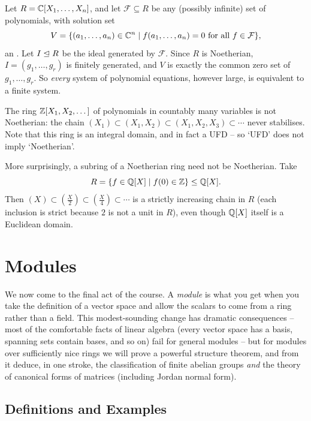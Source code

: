 \documentclass[a4paper]{scrartcl}
\begin{document}
\begin{example}
	Let $R = \mathbb{C}[X_1, \dots, X_n]$, and let $\mathcal{F} \subseteq R$ be any (possibly infinite) set of polynomials, with solution set
	$$
	V = \{(a_1, \dots, a_n) \in \mathbb{C}^n \mid f(a_1, \dots, a_n) = 0 \text{ for all } f \in \mathcal{F}\},
	$$
	an . Let $I \trianglelefteq R$ be the ideal generated by $\mathcal F$. Since $R$ is Noetherian, $I = (g_1, \dots, g_r)$ is finitely generated, and $V$ is exactly the common zero set of $g_1, \dots, g_r$. So \emph{every} system of polynomial equations, however large, is equivalent to a finite system.
\end{example}

\begin{example}
	The ring $\mathbb{Z}[X_1, X_2, \dots]$ of polynomials in countably many variables is not Noetherian: the chain $(X_1) \subset (X_1, X_2) \subset (X_1, X_2, X_3) \subset \cdots$ never stabilises. Note that this ring is an integral domain, and in fact a UFD -- so `UFD' does not imply `Noetherian'.

	More surprisingly, a subring of a Noetherian ring need not be Noetherian. Take
	$$
	R = \{f \in \mathbb{Q}[X] \mid f(0) \in \mathbb{Z}\} \leq \mathbb{Q}[X].
	$$
	Then $(X) \subset \left(\frac{X}{2}\right) \subset \left(\frac{X}{4}\right) \subset \cdots$ is a strictly increasing chain in $R$ (each inclusion is strict because $2$ is not a unit in $R$), even though $\mathbb{Q}[X]$ itself is a Euclidean domain.
\end{example}

\section{Modules}

We now come to the final act of the course. A \emph{module} is what you get when you take the definition of a vector space and allow the scalars to come from a ring rather than a field. This modest-sounding change has dramatic consequences -- most of the comfortable facts of linear algebra (every vector space has a basis, spanning sets contain bases, and so on) fail for general modules -- but for modules over sufficiently nice rings we will prove a powerful structure theorem, and from it deduce, in one stroke, the classification of finite abelian groups \emph{and} the theory of canonical forms of matrices (including Jordan normal form).

\subsection{Definitions and Examples}
\end{document}

